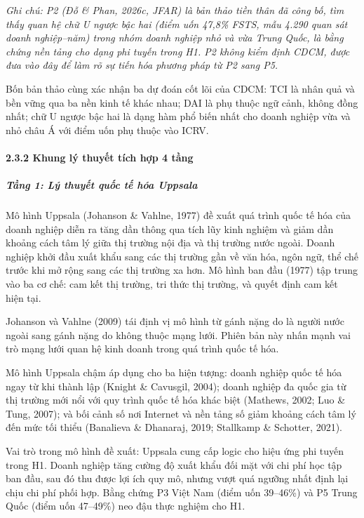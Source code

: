 \documentclass[
  a4paper,
  13pt]{extreport}
\begin{document}
\emph{Ghi chú: P2 (Đỗ \& Phan, 2026c, JFAR) là bản thảo tiền thân đã
công bố, tìm thấy quan hệ chữ U ngược bậc hai (điểm uốn 47,8\% FSTS, mẫu
4.290 quan sát doanh nghiệp--năm) trong nhóm doanh nghiệp nhỏ và vừa
Trung Quốc, là bằng chứng nền tảng cho dạng phi tuyến trong H1. P2 không
kiểm định CDCM, được đưa vào đây để làm rõ sự tiến hóa phương pháp từ P2
sang P5.}

Bốn bản thảo cùng xác nhận ba dự đoán cốt lõi của CDCM: TCI là nhân quả
và bền vững qua ba nền kinh tế khác nhau; DAI là phụ thuộc ngữ cảnh,
không đồng nhất; chữ U ngược bậc hai là dạng hàm phổ biến nhất cho doanh
nghiệp vừa và nhỏ châu Á với điểm uốn phụ thuộc vào ICRV.

\hypertarget{khung-luxfd-thuyux1ebft-tuxedch-hux1ee3p-4-tux1ea7ng}{%
\paragraph{2.3.2 Khung lý thuyết tích hợp 4
tầng}\label{khung-luxfd-thuyux1ebft-tuxedch-hux1ee3p-4-tux1ea7ng}}

\hypertarget{tux1ea7ng-1-luxfd-thuyux1ebft-quux1ed1c-tux1ebf-huxf3a-uppsala}{%
\subparagraph{Tầng 1: Lý thuyết quốc tế hóa
Uppsala}\label{tux1ea7ng-1-luxfd-thuyux1ebft-quux1ed1c-tux1ebf-huxf3a-uppsala}}

Mô hình Uppsala (Johanson \& Vahlne, 1977) đề xuất quá trình quốc tế hóa
của doanh nghiệp diễn ra tăng dần thông qua tích lũy kinh nghiệm và giảm
dần khoảng cách tâm lý giữa thị trường nội địa và thị trường nước ngoài.
Doanh nghiệp khởi đầu xuất khẩu sang các thị trường gần về văn hóa, ngôn
ngữ, thể chế trước khi mở rộng sang các thị trường xa hơn. Mô hình ban
đầu (1977) tập trung vào ba cơ chế: cam kết thị trường, tri thức thị
trường, và quyết định cam kết hiện tại.

Johanson và Vahlne (2009) tái định vị mô hình từ gánh nặng do là người
nước ngoài sang gánh nặng do không thuộc mạng lưới. Phiên bản này nhấn
mạnh vai trò mạng lưới quan hệ kinh doanh trong quá trình quốc tế hóa.

Mô hình Uppsala chậm áp dụng cho ba hiện tượng: doanh nghiệp quốc tế hóa
ngay từ khi thành lập (Knight \& Cavusgil, 2004); doanh nghiệp đa quốc
gia từ thị trường mới nổi với quy trình quốc tế hóa khác biệt (Mathews,
2002; Luo \& Tung, 2007); và bối cảnh số nơi Internet và nền tảng số
giảm khoảng cách tâm lý đến mức tối thiểu (Banalieva \& Dhanaraj, 2019;
Stallkamp \& Schotter, 2021).

Vai trò trong mô hình đề xuất: Uppsala cung cấp logic cho hiệu ứng phi
tuyến trong H1. Doanh nghiệp tăng cường độ xuất khẩu đối mặt với chi phí
học tập ban đầu, sau đó thu được lợi ích quy mô, nhưng vượt quá ngưỡng
nhất định lại chịu chi phí phối hợp. Bằng chứng P3 Việt Nam (điểm uốn
39--46\%) và P5 Trung Quốc (điểm uốn 47--49\%) neo đậu thực nghiệm cho
H1.
\end{document}
